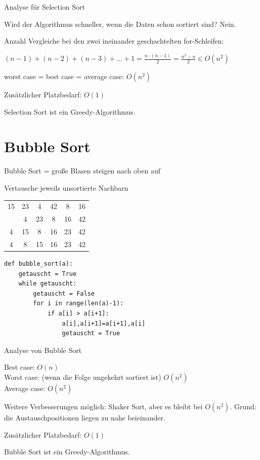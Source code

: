 \documentclass{beamer}
\begin{document}
\begin{frame}[fragile]

Analyse für Selection Sort  

Wird der Algorithmus schneller, wenn die Daten schon sortiert sind? \pause Nein.

Anzahl Vergleiche bei den zwei ineinander geschachtelten for-Schleifen:  \pause

$(n-1) +  (n-2) + (n-3) + ... + 1 =  \frac{n \cdot (n-1)}{2} =\frac{n^2 - n}{2} \in  O(n^2)$ 

worst case  = best case  = average case: $O(n^2)$ 

Zusätzlicher Platzbedarf: \pause $O(1)$

Selection Sort ist ein Greedy-Algorithmus.

\end{frame}

\section{Bubble Sort}
\begin{frame}[fragile]

Bubble Sort  = große Blasen steigen nach oben auf 

\glqq Vertausche jeweils unsortierte Nachbarn \grqq 

\begin{tabular}{cccccc}
15 & 23 & 4 & 42 & 8 & 16 \\ \pause
15 & 4 & 23 & 8 & 16 & 42 \\
4 & 15 & 8 & 16 & 23 & 42 \\ 
4 & 8 & 15 & 16 & 23 & 42 \\ 
\end{tabular}



\end{frame}


\begin{frame}[fragile]
\begin{lstlisting} 
def bubble_sort(a):
    getauscht = True
    while getauscht:
        getauscht = False
        for i in range(len(a)-1):
            if a[i] > a[i+1]:
                a[i],a[i+1]=a[i+1],a[i]
                getauscht = True
\end{lstlisting} 
\end{frame}

\begin{frame}[fragile]

Analyse von Bubble Sort 

Best case: \pause  $O(n)$ \\
Worst case: \pause (wenn die Folge ungekehrt sortiert ist) $O(n^2)$ \\
Average case: $O(n^2)$ 

Weitere Verbesserungen möglich: Shaker Sort, aber es bleibt bei  $O(n^2)$. 
Grund: die Austauschpositionen liegen zu nahe beieinander.

Zusätzlicher Platzbedarf: \pause $O(1)$

Bubble Sort ist ein Greedy-Algorithmus.
\end{frame}
\end{document}
